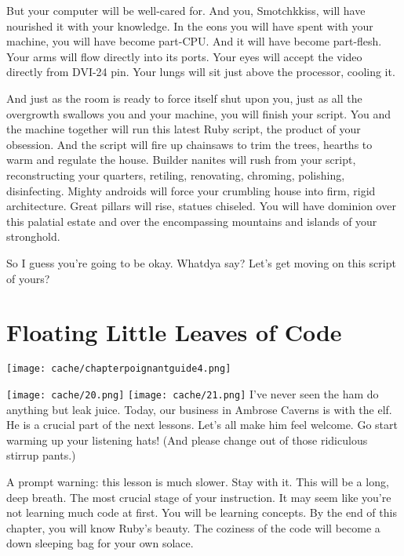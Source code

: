 \documentclass[12pt,twoside]{report}
\begin{document}
But your computer will be well-cared for.  And you, Smotchkkiss, will
have nourished it with your knowledge. In the eons you will have spent
with your machine, you will have become part-CPU.  And it will have
become part-flesh.  Your arms will flow directly into its ports.  Your
eyes will accept the video directly from DVI-24 pin.  Your lungs will
sit just above the processor, cooling it.

And just as the room is ready to force itself shut upon you, just as
all the overgrowth swallows you and your machine, you will finish your
script.  You and the machine together will run this latest Ruby
script, the product of your obsession.  And the script will fire up
chainsaws to trim the trees, hearths to warm and regulate the house.
Builder nanites will rush from your script, reconstructing your
quarters, retiling, renovating, chroming, polishing, disinfecting.
Mighty androids will force your crumbling house into firm, rigid
architecture.  Great pillars will rise, statues chiseled.  You will
have dominion over this palatial estate and over the encompassing
mountains and islands of your stronghold.

So I guess you're going to be okay.  Whatdya say?  Let's get moving on
this script of yours?
\newpage
\thispagestyle{empty}
\mbox{}

\cleartooddpage

\chapter{Floating Little Leaves of Code}
\vfill
\begin{center}
  \texttt{[image: cache/chapterpoignantguide4.png]}
\end{center}
\vspace{2cm}
\newpage
\thispagestyle{empty}
\mbox{}
\clearpage
	\texttt{[image: cache/20.png]}
        \texttt{[image: cache/21.png]}
\clearpage
I've never seen the ham do anything but leak juice.  Today, our
business in Ambrose Caverns is with the elf.  He is a crucial part of
the next lessons. Let's all make him feel welcome. Go start warming up
your listening hats!  (And please change out of those ridiculous
stirrup pants.)

A prompt warning: this lesson is much slower.  Stay with it.  This
will be a long, deep breath. The most crucial stage of your
instruction.  It may seem like you're not learning much code at first.
You will be learning concepts.  By the end of this chapter, you will
know Ruby's beauty.  The coziness of the code will become a down
sleeping bag for your own solace.
\end{document}
